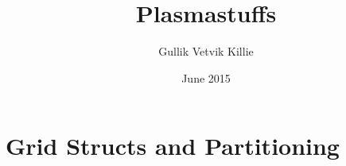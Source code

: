 \documentclass[x11names,twoside,english]{uiofysmaster}
\author{Gullik Vetvik Killie}
\title{Plasmastuffs}
\date{June 2015}
\begin{document}
% 


% 

% 

% 

% 

% 

\appendix
% 
% 
\chapter{Grid Structs and Partitioning}


\printbibliography
\end{document}
